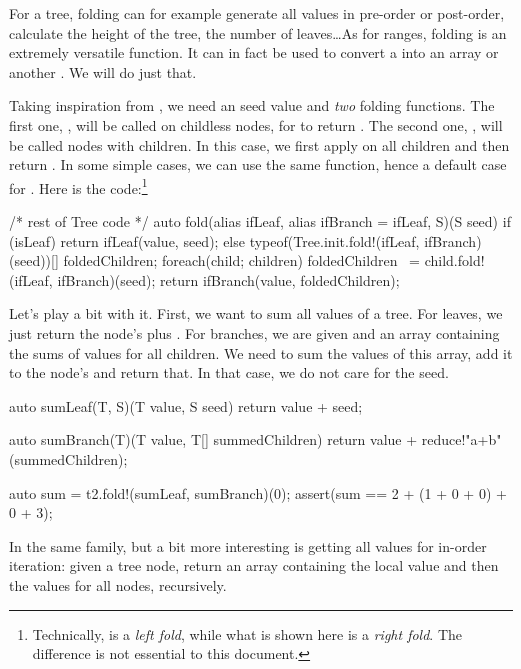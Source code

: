 For a tree, folding can for example generate all values in pre-order or post-order, calculate the height of the tree, the number of leaves\ldots As for ranges, folding is an extremely versatile function. It can in fact be used to convert a  into an array or another . We will do just that.

Taking inspiration from , we need an seed value and \emph{two} folding functions. The first one, , will be called on childless nodes, for  to return . The second one, , will be called nodes with children. In this case, we first apply  on all children and then return . In some simple cases, we can use the same function, hence a default case for . Here is the code:\footnote{ Technically,  is a \emph{left fold}, while what is shown here is a \emph{right fold}. The difference is not essential to this document.} 

\begin{dcode}
/* rest of Tree code */
auto fold(alias ifLeaf, alias ifBranch = ifLeaf, S)(S seed)
{
    if (isLeaf)
    {
        return ifLeaf(value, seed);
    }
    else
    {
        typeof(Tree.init.fold!(ifLeaf, ifBranch)(seed))[] foldedChildren;
        foreach(child; children) 
            foldedChildren ~= child.fold!(ifLeaf, ifBranch)(seed);
        return ifBranch(value, foldedChildren);
    }
}
\end{dcode}

Let's play a bit with it. First, we want to sum all values of a tree. For leaves, we just return the node's  plus . For branches, we are given  and an array containing the sums of values for all children. We need to sum the values of this array, add it to the node's  and return that. In that case, we do not care for the seed.

\begin{dcode}
auto sumLeaf(T, S)(T value, S seed)
{
    return value + seed;
}

auto sumBranch(T)(T value, T[] summedChildren)
{
    return value + reduce!"a+b"(summedChildren);
}

auto sum = t2.fold!(sumLeaf, sumBranch)(0);
assert(sum == 2 + (1 + 0 + 0) + 0 + 3);
\end{dcode}

In the same family, but a bit more interesting is getting all values for in-order iteration: given a tree node, return an array containing the local value and then the values for all nodes, recursively.

